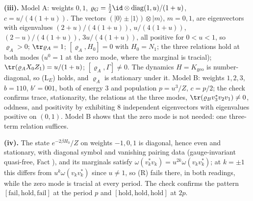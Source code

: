 \textbf{(iii).} Model A: weights $0, 1$, $\varrho_G = \tfrac12\id \otimes \operatorname{diag}(1, u)/(1 + u)$, $c = u/(4(1 + u))$. The vectors $(|0\rangle \pm |1\rangle) \otimes |m\rangle$, $m = 0, 1$, are eigenvectors with eigenvalues $(2 + u)/(4(1 + u))$, $u/(4(1 + u))$, $(2 - u)/(4(1 + u))$, $3u/(4(1 + u))$, all positive for $0 < u < 1$, so $\varrho_A > 0$; $\tr\varrho_A = 1$; $[\varrho_A, H_0] = 0$ with $H_0 = N_1$; the three relations hold at both modes ($u^{0} = 1$ at the zero mode, where the marginal is tracial); $\tr(\varrho_A X_0Z_1) = u/(1 + u)$; $[\varrho_A, \Gamma] \neq 0$. The dynamics $H = K_{\mathrm{geo}}$ is number-diagonal, so (L$_E$) holds, and $\varrho_A$ is stationary under it. Model B: weights $1, 2, 3$, $b = 110$, $b' = 001$, both of energy $3$ and population $p = u^{3}/Z$, $c = p/2$; the check confirms trace, stationarity, the relations at the three modes, $\tr(\varrho_B v_3^{*}v_2v_1) \neq 0$, oddness, and positivity by exhibiting $8$ independent eigenvectors with eigenvalues positive on $(0, 1)$. Model B shows that the zero mode is not needed: one three-term relation suffices.

\textbf{(iv).} The state $e^{-2\beta H_0}/Z$ on weights $-1, 0, 1$ is diagonal, hence even and stationary, with diagonal symbol and vanishing pairing data (gauge-invariant quasi-free, Fact ), and its marginals satisfy $\omega(v_k^{*}v_k) = u^{2k}\omega(v_kv_k^{*})$; at $k = \pm 1$ this differs from $u^{k}\omega(v_kv_k^{*})$ since $u \neq 1$, so (R) fails there, in both readings, while the zero mode is tracial at every period. The check confirms the pattern $[\text{fail}, \text{hold}, \text{fail}]$ at the period $p$ and $[\text{hold}, \text{hold}, \text{hold}]$ at $2p$.

